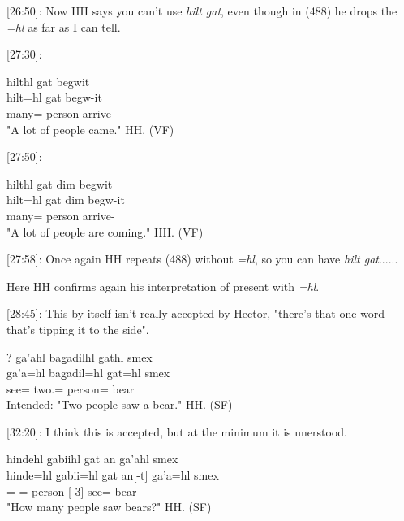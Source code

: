 [26:50]: Now HH says you can't use \textit{hilt gat}, even though in (488) he drops the \textit{=hl} as far as I can tell. 

[27:30]:

\begin{exe}
    \ex \glll
    hilthl gat begwit \\
    hilt=hl gat begw-it\\
    many=\Cn{} person arrive-\Sx{}\\
    \glt "A lot of people came." \hfill HH.\ElicitationDate{} (VF)
\end{exe}

[27:50]:

\begin{exe}
    \ex \glll
    hilthl gat dim begwit \\
    hilt=hl gat dim begw-it\\
    many=\Cn{} person \Prosp{} arrive-\Sx{}\\
    \glt "A lot of people are coming." \hfill HH.\ElicitationDate{} (VF)
\end{exe}

[27:58]: Once again HH repeats (488) without \textit{=hl}, so you can have \textit{hilt gat}...... 

Here HH confirms again his interpretation of present with \textit{=hl}.

[28:45]: This by itself isn't really accepted by Hector, "there's that one word that's tipping it to the side". 

\begin{exe}
    \ex \glll
    ? ga'ahl bag̱adilhl gathl smex\\
    {} ga'a=hl bag̱adil=hl gat=hl smex \\
    {} see=\Cn{} two.\Hum{}=\Cn{} person=\Cn{} bear\\
    \glt Intended: "Two people saw a bear." \hfill HH.\ElicitationDate{} (SF)
\end{exe}

[32:20]: I think this is accepted, but at the minimum it is unerstood.

\begin{exe}
    \ex \glll
    hindehl g̱abiihl gat an ga'ahl smex \\
    hinde=hl g̱abii=hl gat an[-t] ga'a=hl smex\\
    \Wh{}=\Cn{} \Cnt{}=\Cn{} person \Ax{}[-3] see=\Cn{} bear\\
    \glt "How many people saw bears?" \hfill HH.\ElicitationDate{} (SF)
\end{exe}

